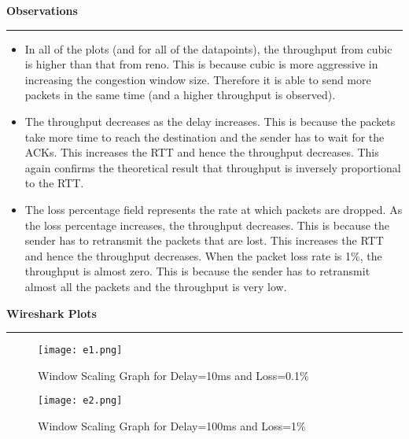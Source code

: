 \documentclass[a4paper,12pt]{article}
\newenvironment{solution}[2][]{%
    \begin{mdframed}[linecolor=blue!70!black, linewidth=2pt, roundcorner=10pt, backgroundcolor=yellow!10!white, skipabove=12pt, skipbelow=12pt]%
        \textbf{\large #2}
        \par\noindent\rule{\textwidth}{0.4pt}
}{
    \end{mdframed}
}
\begin{document}
\begin{solution}{Observations}
    \begin{itemize}
        \item In all of the plots (and for all of the datapoints), the throughput from cubic is higher than that from reno. This is because cubic is more aggressive in increasing the congestion window size. Therefore it is able to send more packets in the same time (and a higher throughput is observed).
        \item The throughput decreases as the delay increases. This is because the packets take more time to reach the destination and the sender has to wait for the ACKs. This increases the RTT and hence the throughput decreases. This again confirms the theoretical result that throughput is inversely proportional to the RTT.
        \item The loss percentage field represents the rate at which packets are dropped. As the loss percentage increases, the throughput decreases. This is because the sender has to retransmit the packets that are lost. This increases the RTT and hence the throughput decreases. When the packet loss rate is 1\%, the throughput is almost zero. This is because the sender has to retransmit almost all the packets and the throughput is very low.
    \end{itemize}
\end{solution}

\clearpage

\begin{solution}{Wireshark Plots}
    \begin{figure}[H]
        \centering
        \texttt{[image: e1.png]}
        \caption{Window Scaling Graph for Delay=10ms and Loss=0.1\%}
    \end{figure}

    \begin{figure}[H]
        \centering
        \texttt{[image: e2.png]}
        \caption{Window Scaling Graph for Delay=100ms and Loss=1\%}
    \end{figure}
\end{solution}
\end{document}
